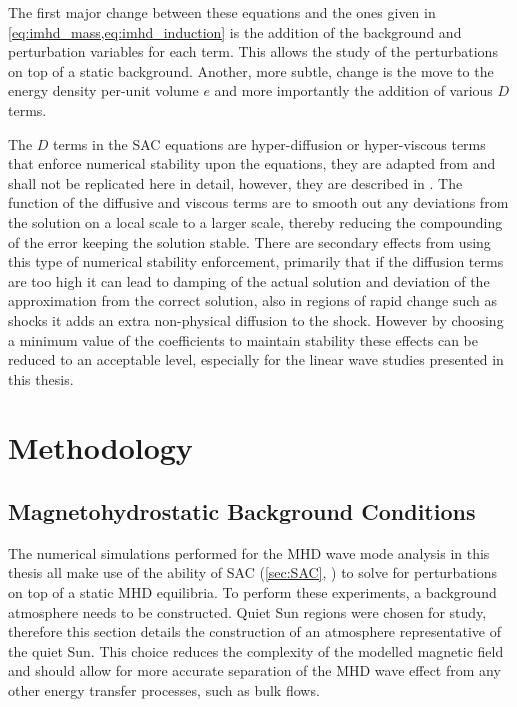 \documentclass[a4paper,12pt,fourier,authoryear,custommargin]{Classes/PhDThesisPSnPDF}
\begin{document}
The first major change between these equations and the ones given in \cref{eq:imhd_mass,eq:imhd_induction} is the addition of the background and perturbation variables for each term.
This allows the study of the perturbations on top of a static background.
Another, more subtle, change is the move to the energy density per-unit volume $e$ and more importantly the addition of various $D$ terms.

The $D$ terms in the SAC equations are hyper-diffusion or hyper-viscous terms that enforce numerical stability upon the equations, they are adapted from \cite{nordlund1995} and shall not be replicated here in detail, however, they are described in \citet{shelyag2008}.
The function of the diffusive and viscous terms are to smooth out any deviations from the solution on a local scale to a larger scale, thereby reducing the compounding of the error keeping the solution stable.
There are secondary effects from using this type of numerical stability enforcement, primarily that if the diffusion terms are too high it can lead to damping of the actual solution and deviation of the approximation from the correct solution, also in regions of rapid change such as shocks it adds an extra non-physical diffusion to the shock.
However by choosing a minimum value of the coefficients to maintain stability these effects can be reduced to an acceptable level, especially for the linear wave studies presented in this thesis.

\clearpage{}%
%

%
\clearpage{}%
\chapter{Methodology}\label{ch:methodology}  %


\section{Magnetohydrostatic Background Conditions}\label{sec:mhsbackground}

The numerical simulations performed for the MHD wave mode analysis in this thesis all make use of the ability of SAC (\cref{sec:SAC}, \citealt{shelyag2008}) to solve for perturbations on top of a static MHD equilibria.
To perform these experiments, a background atmosphere needs to be constructed.
Quiet Sun regions were chosen for study, therefore this section details the construction of an atmosphere representative of the quiet Sun.
This choice reduces the complexity of the modelled magnetic field and should allow for more accurate separation of the MHD wave effect from any other energy transfer processes, such as bulk flows.
\end{document}
